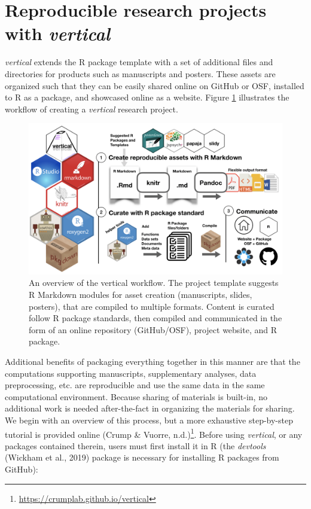 \documentclass[
  english,
  jou,floatsintext]{apa6}
\begin{document}
\hypertarget{reproducible-research-projects-with-vertical}{%
\section{\texorpdfstring{Reproducible research projects with \emph{vertical}}{Reproducible research projects with vertical}}\label{reproducible-research-projects-with-vertical}}

\emph{vertical} extends the R package template with a set of additional files and directories for products such as manuscripts and posters. These assets are organized such that they can be easily shared online on GitHub or OSF, installed to R as a package, and showcased online as a website. Figure \ref{fig:vertical-workflow} illustrates the workflow of creating a \emph{vertical} research project.

\begin{figure}

{\centering \includegraphics[width=\textwidth]{images/vertical-workflow} 

}

\caption{An overview of the vertical workflow. The project template suggests R Markdown modules for asset creation (manuscripts, slides, posters), that are compiled to multiple formats. Content is curated follow R package standards, then compiled and communicated in the form of an online repository (GitHub/OSF), project website, and R package.}\label{fig:vertical-workflow}
\end{figure}

Additional benefits of packaging everything together in this manner are that the computations supporting manuscripts, supplementary analyses, data preprocessing, etc. are reproducible and use the same data in the same computational environment. Because sharing of materials is built-in, no additional work is needed after-the-fact in organizing the materials for sharing. We begin with an overview of this process, but a more exhaustive step-by-step tutorial is provided online (Crump \& Vuorre, n.d.)\footnote{\url{https://crumplab.github.io/vertical}}. Before using \emph{vertical}, or any packages contained therein, users must first install it in R (the \emph{devtools} (Wickham et al., 2019) package is necessary for installing R packages from GitHub):
\end{document}
